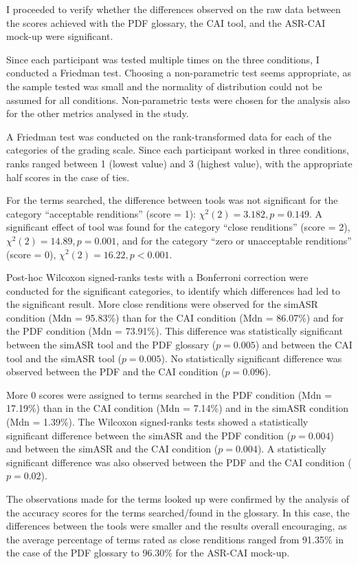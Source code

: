 I proceeded to verify whether the differences observed on the raw data between the scores achieved with the PDF glossary, the CAI tool, and the ASR-CAI mock-up were significant.

Since each participant was tested multiple times on the three conditions, I conducted a Friedman test. Choosing a non-parametric test seems appropriate, as the sample tested was small and the normality of distribution could not be assumed for all conditions. Non-parametric tests were chosen for the analysis also for the other metrics analysed in the study.

A Friedman test was conducted on the rank-transformed data for each of the categories of the grading scale. Since each participant worked in three conditions, ranks ranged between 1 (lowest value) and 3 (highest value), with the appropriate half scores in the case of ties.

For the terms searched, the difference between tools was not significant for the category ``acceptable renditions'' (score = 1): $\chi^2(2) = 3.182, p = 0.149$. A significant effect of tool was found for the category ``close renditions'' (score = 2), $\chi^2(2) = 14.89, p = 0.001$, and for the category ``zero or unacceptable renditions'' (score = 0), $\chi^2(2) = 16.22, p < 0.001$.

Post-hoc Wilcoxon signed-ranks tests with a Bonferroni correction were conducted for the significant categories, to identify which differences had led to the significant result. More close renditions were observed for the simASR condition (Mdn = 95.83\%) than for the CAI condition (Mdn = 86.07\%) and for the PDF condition (Mdn = 73.91\%). This difference was statistically significant between the simASR tool and the PDF glossary ($p = 0.005$) and between the CAI tool and the simASR tool ($p = 0.005$). No statistically significant difference was observed between the PDF and the CAI condition ($p = 0.096$).

More 0 scores were assigned to terms searched in the PDF condition (Mdn = 17.19\%) than in the CAI condition (Mdn = 7.14\%) and in the simASR condition (Mdn = 1.39\%). The Wilcoxon signed-ranks tests showed a statistically significant difference between the simASR and the PDF condition ($p=0.004$) and between the simASR and the CAI condition ($p=0.004$). A statistically significant difference was also observed between the PDF and the CAI condition ($p = 0.02$).

 \label{accuracy_found}
The observations made for the terms looked up were confirmed by the analysis of the accuracy scores for the terms searched/found in the glossary. In this case, the differences between the tools were smaller and the results overall encouraging, as the average percentage of terms rated as close renditions ranged from 91.35\% in the case of the PDF glossary to 96.30\% for the ASR-CAI mock-up.

